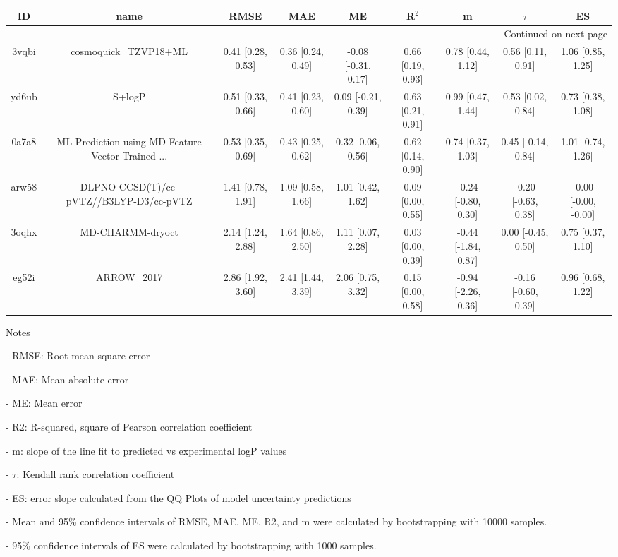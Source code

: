 \documentclass{article}
\begin{document}
\begin{center}
\scriptsize
\begin{longtable}{|ccccccccc|}
\toprule
    ID &                                               name &               RMSE &                MAE &                   ME &              R$^2$ &                    m &               $\tau$ &                    ES \\
\midrule
\endhead
\midrule
\multicolumn{9}{r}{{Continued on next page}} \\
\midrule
\endfoot

\bottomrule
\endlastfoot
 3vqbi &                              cosmoquick\_TZVP18+ML &  0.41 [0.28, 0.53] &  0.36 [0.24, 0.49] &  -0.08 [-0.31, 0.17] &  0.66 [0.19, 0.93] &    0.78 [0.44, 1.12] &    0.56 [0.11, 0.91] &     1.06 [0.85, 1.25] \\
 yd6ub &                                             S+logP &  0.51 [0.33, 0.66] &  0.41 [0.23, 0.60] &   0.09 [-0.21, 0.39] &  0.63 [0.21, 0.91] &    0.99 [0.47, 1.44] &    0.53 [0.02, 0.84] &     0.73 [0.38, 1.08] \\
 0a7a8 &  ML Prediction using MD Feature Vector Trained ... &  0.53 [0.35, 0.69] &  0.43 [0.25, 0.62] &    0.32 [0.06, 0.56] &  0.62 [0.14, 0.90] &    0.74 [0.37, 1.03] &   0.45 [-0.14, 0.84] &     1.01 [0.74, 1.26] \\
 arw58 &            DLPNO-CCSD(T)/cc-pVTZ//B3LYP-D3/cc-pVTZ &  1.41 [0.78, 1.91] &  1.09 [0.58, 1.66] &    1.01 [0.42, 1.62] &  0.09 [0.00, 0.55] &  -0.24 [-0.80, 0.30] &  -0.20 [-0.63, 0.38] &  -0.00 [-0.00, -0.00] \\
 3oqhx &                                   MD-CHARMM-dryoct &  2.14 [1.24, 2.88] &  1.64 [0.86, 2.50] &    1.11 [0.07, 2.28] &  0.03 [0.00, 0.39] &  -0.44 [-1.84, 0.87] &   0.00 [-0.45, 0.50] &     0.75 [0.37, 1.10] \\
 eg52i &                                        ARROW\_2017 &  2.86 [1.92, 3.60] &  2.41 [1.44, 3.39] &    2.06 [0.75, 3.32] &  0.15 [0.00, 0.58] &  -0.94 [-2.26, 0.36] &  -0.16 [-0.60, 0.39] &     0.96 [0.68, 1.22] \\
\end{longtable}
\end{center}

Notes

- RMSE: Root mean square error

- MAE: Mean absolute error

- ME: Mean error

- R2: R-squared, square of Pearson correlation coefficient

- m: slope of the line fit to predicted vs experimental logP values

- $\tau$:  Kendall rank correlation coefficient

- ES: error slope calculated from the QQ Plots of model uncertainty predictions

- Mean and 95\% confidence intervals of RMSE, MAE, ME, R2, and m were calculated by bootstrapping with 10000 samples.

- 95\% confidence intervals of ES were calculated by bootstrapping with 1000 samples.\end{document}
\end{document}
